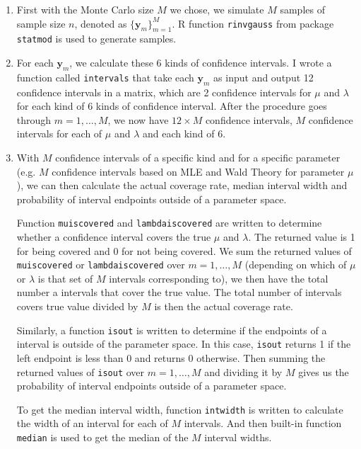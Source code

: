 \documentclass{article}
\begin{document}
    \begin{enumerate}
    	\item 
    	First with the Monte Carlo size $M$ we chose, we simulate $M$ samples of sample size $n$, denoted as $\{\bm y_m\}_{m=1}^M$. R function \verb|rinvgauss| from package \verb|statmod| is used to generate samples.

    	 \item 
    	 For each $\bm y_m$, we calculate these 6 kinds of confidence intervals. I wrote a function called \verb|intervals| that take each $\bm y_m$ as input and output 12 confidence intervals in a matrix, which are 2 confidence intervals for $\mu$ and $\lambda$ for each kind of 6 kinds of confidence interval. After the procedure goes through $m = 1,\ldots, M$, we now have $12 \times M$ confidence intervals, $M$ confidence intervals for each of $\mu$ and $\lambda$ and each kind of 6. 
         
         \item 
         With $M$ confidence intervals of a specific kind and for a specific parameter (e.g. $M$ confidence intervals based on MLE and Wald Theory for parameter $\mu$), we can then calculate the actual coverage rate, median interval width and probability of interval endpoints outside of a parameter space. 

         Function \verb|muiscovered| and \verb|lambdaiscovered| are written to determine whether a confidence interval covers the true $\mu$ and $\lambda$. The returned value is 1 for being covered and 0 for not being covered. We sum the returned values of \verb|muiscovered| or \verb|lambdaiscovered| over $m = 1, \ldots, M$ (depending on which of $\mu$ or $\lambda$ is that set of $M$ intervals corresponding to), we then have the total number a intervals that cover the true value. The total number of intervals covers true value divided by $M$ is then the actual coverage rate.

         Similarly, a function \verb|isout| is written to determine if the endpoints of a interval is outside of the parameter space. In this case, \verb|isout| returns 1 if the left endpoint is less than 0 and returns 0 otherwise. Then summing the returned values of \verb|isout| over $m = 1, \ldots, M$ and dividing it by $M$ gives us the probability of interval endpoints outside of a parameter space.

         To get the median interval width, function \verb|intwidth| is written to calculate the width of an interval for each of $M$ intervals. And then built-in function \verb|median| is used to get the median of the $M$ interval widths.  
    \end{enumerate}
\end{document}
